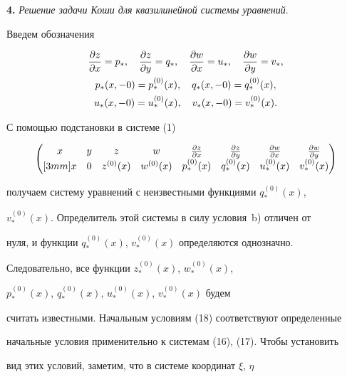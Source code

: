  


{\bf 4.} {\it Решение задачи Коши для квазилинейной системы уравнений}. 


Введем обозначения 


\begin{gather*} 


\myfrac{z}{x}=p_*,\quad \myfrac{z}{y}=q_*,\quad 


\myfrac{w}{x}=u_*,\quad \myfrac{w}{y}=v_*,\\ 


% 


p_*(x,-0)=p^{(0)}_*(x),\quad q_*(x,-0)=q^{(0)}_*(x),\\ 


% 


u_*(x,-0)=u^{(0)}_*(x),\quad v_*(x,-0)=v^{(0)}_*(x). 


\end{gather*} 


С помощью подстановки в системе (1) 


$$ 


\begin{pmatrix} 


x & y & z & w & \myfrac{z}{x} & \myfrac{z}{y} 


& \myfrac{w}{x} & \myfrac{w}{y} \\ [3mm]


x & 0 & z^{(0)}(x) & w^{(0)}(x) & p^{(0)}_*(x) & 


q^{(0)}_*(x) & u^{(0)}_*(x) & v^{(0)}_*(x) 


\end{pmatrix} 


$$ 


получаем систему уравнений с неизвестными функциями $q^{(0)}_*(x)$, 


$v^{(0)}_*(x)$. Определитель этой системы в силу условия~b) отличен от 


нуля, и функции $q^{(0)}_*(x)$, $v^{(0)}_*(x)$ определяются однозначно. 


Следовательно, все функции $z^{(0)}_*(x)$, $w^{(0)}_*(x)$, 


$p^{(0)}_*(x)$, $q^{(0)}_*(x)$, $u^{(0)}_*(x)$, $v^{(0)}_*(x)$ будем 


считать известными. Начальным условиям (18) соответствуют определенные 


начальные условия применительно к системам (16), (17). Чтобы установить 


вид этих условий, заметим, что в системе координат $\xi$, $\eta$ 


